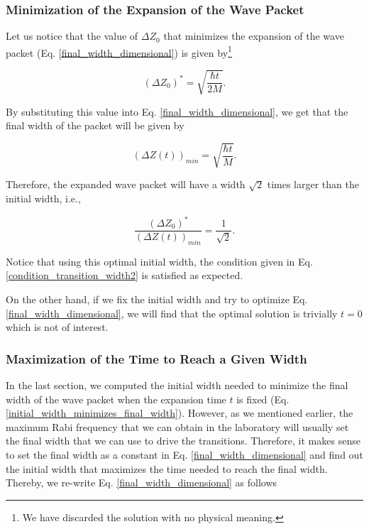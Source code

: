 \documentclass{article}
\begin{document}
\subsubsection{Minimization of the Expansion of the Wave Packet}
Let us notice that the value of $\Delta Z_{0}$ that minimizes the expansion of the wave packet (Eq. \ref{final_width_dimensional}) is given by\footnote{We have discarded the solution with no physical meaning.}

\begin{equation}\label{initial_width_minimizes_final_width}
    (\Delta Z_{0})^{\ast} = \sqrt{\frac{\hbar t }{2M}}.
\end{equation}

By substituting this value into Eq. \ref{final_width_dimensional}, we get that the final width of the packet will be given by

\begin{equation}\label{final_width_minimum}
    (\Delta Z(t))_{min}  = \sqrt{\frac{\hbar t}{M}}.
\end{equation}

Therefore, the expanded wave packet will have a width $\sqrt{2}$ times larger than the initial width, i.e.,

\begin{equation}\label{ration_optimial_initial_width_vs_final_width}
    \frac{(\Delta Z_{0})^{\ast}}{(\Delta Z(t))_{min}} = \frac{1}{\sqrt{2}}.
\end{equation}

Notice that using this optimal initial width, the condition given in Eq. \ref{condition_transition_width2} is satisfied as expected. 

On the other hand, if we fix the initial width and try to optimize Eq. \ref{final_width_dimensional}, we will find that the optimal solution is trivially $t=0$ which is not of interest.

\subsubsection{Maximization of the Time to Reach a Given Width}
In the last section, we computed the initial width needed to minimize the final width of the wave packet when the expansion time $t$ is fixed (Eq. \ref{initial_width_minimizes_final_width}). However, as we mentioned earlier, the maximum Rabi frequency that we can obtain in the laboratory will usually set the final width that we can use to drive the transitions. Therefore, it makes sense to set the final width as a constant in Eq. \ref{final_width_dimensional} and find out the initial width that maximizes the time needed to reach the final width. Thereby, we re-write Eq. \ref{final_width_dimensional} as follows
\end{document}
